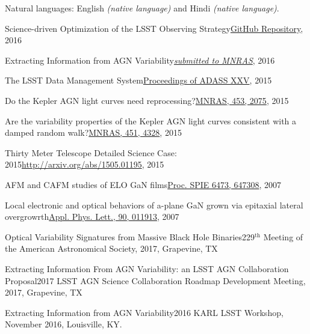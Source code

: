 \documentclass[10pt,a4paper]{article}
\begin{document}
\vspace{0.5em}
\inlineheadsection
  {Natural languages:}
  {English \emph{(native language)} and Hindi \emph{(native language)}.}


\spacedhrule{1.6em}{-0.4em}



\inlineheadsection
  {Science-driven Optimization of the LSST Observing Strategy}{\href{https://github.com/LSSTScienceCollaborations/ObservingStrategy}{GitHub Repository}, 2016}

\inlineheadsection
  {Extracting Information from AGN Variability}{\href{https://arxiv.org/abs/1607.04299}{\textit{submitted to MNRAS}}, 2016}

\inlineheadsection
  {The LSST Data Management System}{\href{http://adsabs.harvard.edu/cgi-bin/bib_query?arXiv:1512.07914}{Proceedings of ADASS XXV}, 2015}

\inlineheadsection
  {Do the Kepler AGN light curves need reprocessing?}{\href{http://dx.doi.org/10.1093/mnras/stv1797}{MNRAS, 453, 2075}, 2015}

\inlineheadsection
  {Are the variability properties of the Kepler AGN light curves consistent with a damped random walk?}{\href{http://dx.doi.org/ 10.1093/mnras/stv1230}{MNRAS, 451, 4328}, 2015}

\inlineheadsection
 {Thirty Meter Telescope Detailed Science Case: 2015}{\href{http://arxiv.org/abs/1505.01195}{http://arxiv.org/abs/1505.01195}, 2015}

\inlineheadsection
  {AFM and CAFM studies of ELO GaN films}{\href{http://dx.doi.org/10.1117/12.706773}{Proc. SPIE 6473, 647308}, 2007}

\inlineheadsection
  {Local electronic and optical behaviors of a-plane GaN grown via epitaxial lateral overgrowrth}{\href{http://dx.doi.org/10.1063/1.2429901}{Appl. Phys. Lett., 90, 011913}, 2007}


\spacedhrule{1.0em}{-0.4em}



\inlineheadsection
  {Optical Variability Signatures from Massive Black Hole Binaries}{229$^{\mathrm{th}}$ Meeting of the American Astronomical Society, 2017, Grapevine, TX}

\inlineheadsection
  {Extracting Information From AGN Variability: an LSST AGN Collaboration Proposal}{2017 LSST AGN Science Collaboration Roadmap Development Meeting, 2017, Grapevine, TX}

\inlineheadsection
  {Extracting Information from AGN Variability}{2016 KARL LSST Workshop, November 2016, Louisville, KY.}
\end{document}
